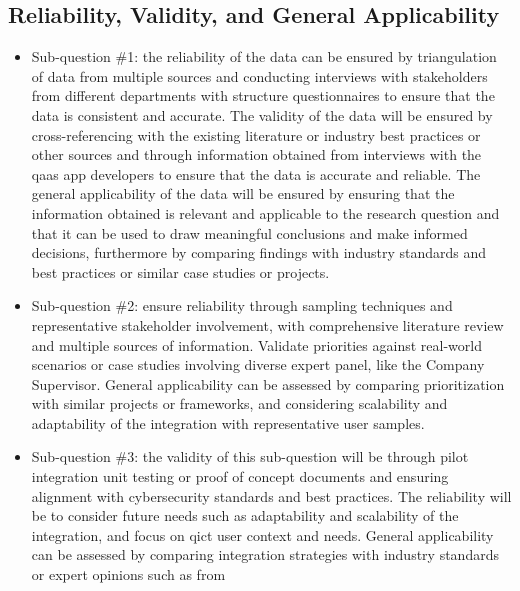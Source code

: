 \begin{multicols}{2}
      \subsection{Reliability, Validity, and General Applicability}
      \begin{itemize}[label=-]
            \item Sub-question \#1: the reliability of the data can be ensured by triangulation of data from
                  multiple sources and conducting interviews with stakeholders from different departments with
                  structure questionnaires to ensure that the data is consistent and accurate. The validity of
                  the data will be ensured by  cross-referencing with the existing literature or industry best
                  practices or other sources and  through information obtained from  interviews with the
                  \acrshort{qaas} app developers to ensure  that the data is accurate and reliable. The general
                  applicability of the data will be ensured by  ensuring that the information obtained is relevant
                  and applicable to the research question and  that it can be used to draw meaningful conclusions
                  and make informed decisions, furthermore by comparing findings with industry standards and best
                  practices or similar case studies or projects.
            \item Sub-question \#2: ensure reliability through sampling techniques and representative stakeholder
                  involvement, with comprehensive literature review and multiple sources of information. Validate
                  priorities against real-world scenarios or case studies involving diverse expert panel, like
                  the Company Supervisor. General applicability can be assessed by comparing prioritization with
                  similar projects or frameworks, and considering scalability and adaptability of the integration
                  with representative user samples.
            \item Sub-question \#3: the validity of this sub-question will be through pilot integration unit testing
                  or proof of concept documents and ensuring alignment with cybersecurity standards and best
                  practices. The reliability will be to consider future needs such as adaptability and scalability of
                  the integration, and focus on \acrshort{qict} user context and needs. General applicability can be
                  assessed by comparing integration strategies with industry standards or expert opinions such as from

\end{itemize}
\end{multicols}
